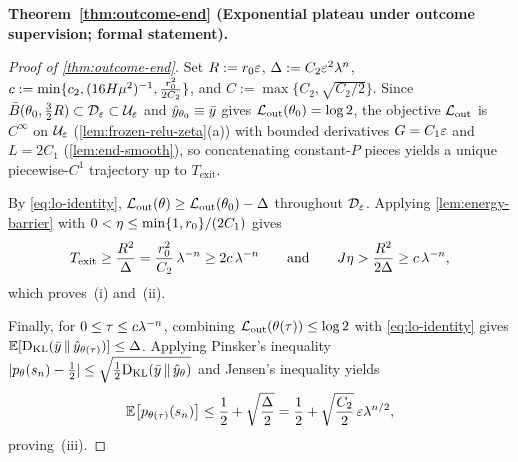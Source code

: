 \par\bigskip\noindent\textbf{Theorem~\ref{thm:outcome-end} (Exponential plateau under outcome supervision; formal statement).}\par\smallskip

\begin{proof}[Proof of \cref{thm:outcome-end}]
Set $R := r_0\varepsilon$, $\Delta := C_2\varepsilon^2\lambda^n$, $c := \min\{c_2, (16H\mu^2)^{-1}, \frac{r_0^2}{2C_2}\}$, and $C := \max\{C_2, \sqrt{C_2/2}\}$. Since $\bar B(\theta_0, \frac{3}{2}R) \subset \mathcal D_{\varepsilon} \subset \mathcal U_{\varepsilon}$ and $\hat y_{\theta_0} \equiv \bar y$ gives $\mathcal L_{\mathrm{out}}(\theta_0) = \log 2$, the objective $\mathcal L_{\mathrm{out}}$ is $C^\infty$ on $\mathcal U_{\varepsilon}$ (\cref{lem:frozen-relu-zeta}(a)) with bounded derivatives $G = C_1\varepsilon$ and $L = 2C_1$ (\cref{lem:end-smooth}), so concatenating constant-$P$ pieces yields a unique piecewise-$C^1$ trajectory up to $T_{\mathrm{exit}}$.

By \cref{eq:lo-identity}, $\mathcal L_{\mathrm{out}}(\theta) \ge \mathcal L_{\mathrm{out}}(\theta_0) - \Delta$ throughout $\mathcal D_{\varepsilon}$. Applying \cref{lem:energy-barrier} with $0 < \eta \le \min\{1, r_0\}/(2C_1)$ gives
\[
  T_{\mathrm{exit}} \ge \frac{R^2}{\Delta} = \frac{r_0^2}{C_2}\,\lambda^{-n} \ge 2c\,\lambda^{-n}
  \qquad\text{and}\qquad
  J\eta > \frac{R^2}{2\Delta} \ge c\,\lambda^{-n},
\]
which proves~(i) and~(ii).

Finally, for $0 \le \tau \le c\lambda^{-n}$, combining $\mathcal L_{\mathrm{out}}(\theta(\tau)) \le \log 2$ with \cref{eq:lo-identity} gives $\mathbb E[\mathrm{D}_{\mathrm{KL}}(\bar y \,\|\, \hat y_{\theta(\tau)})] \le \Delta$. Applying Pinsker's inequality $|p_\theta(s_n) - \frac{1}{2}| \le \sqrt{\frac{1}{2}\mathrm{D}_{\mathrm{KL}}(\bar y \,\|\, \hat y_\theta)}$ and Jensen's inequality yields
\[
  \mathbb E\bigl[p_{\theta(\tau)}(s_n)\bigr] \le \frac{1}{2} + \sqrt{\frac{\Delta}{2}} = \frac{1}{2} + \sqrt{\frac{C_2}{2}}\,\varepsilon\lambda^{n/2},
\]
proving~(iii).
\end{proof}

